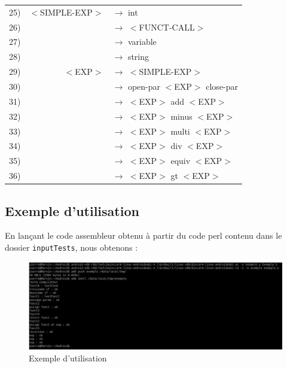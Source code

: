 \documentclass[a4paper,10pt]{article}
\begin{document}
\begin{tabular}{rrl}
25)&$<$SIMPLE-EXP$>$	& $\rightarrow$ int \\
26)&					& $\rightarrow$ $<$FUNCT-CALL$>$ \\
27)&					& $\rightarrow$ variable \\
28)&					& $\rightarrow$ string \\

29)&$<$EXP$>$			& $\rightarrow$ $<$SIMPLE-EXP$>$   \\
30)&					& $\rightarrow$ open-par $<$EXP$>$ close-par\\ 
31)&					& $\rightarrow$ $<$EXP$>$ add $<$EXP$>$ \\
32)&					& $\rightarrow$ $<$EXP$>$ minus $<$EXP$>$ \\
33)&					& $\rightarrow$ $<$EXP$>$ multi $<$EXP$>$ \\
34)&					& $\rightarrow$ $<$EXP$>$ div $<$EXP$>$ \\
35)&					& $\rightarrow$ $<$EXP$>$ equiv $<$EXP$>$ \\
36)&					& $\rightarrow$ $<$EXP$>$ gt $<$EXP$>$ \\
\end{tabular}

\subsection{Exemple d'utilisation}
En lançant le code assembleur obtenu à partir du code perl contenu dans le dossier \verb?inputTests?, nous obtenons : 
 \begin{figure}[H] \hspace*{-2cm} 
   \centering
   	  \includegraphics[width=375pt]{exemple.jpg} 
			\caption{Exemple d'utilisation}
			\label{ExempleUtilisation}
 \end{figure}
\end{document}
